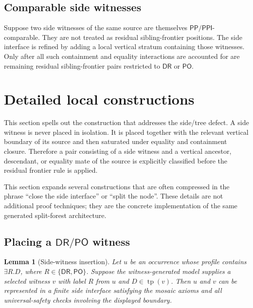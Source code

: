 \documentclass[11pt]{article}
\newtheorem{lemma}[theorem]{Lemma}
\newcommand{\DR}{\mathsf{DR}}
\newcommand{\PO}{\mathsf{PO}}
\newcommand{\PP}{\mathsf{PP}}
\newcommand{\PPI}{\mathsf{PPI}}
\newcommand{\typ}{\operatorname{tp}}
\begin{document}
\subsection{Comparable side witnesses}

Suppose two side witnesses of the same source are themselves $\PP/\PPI$-comparable.  They are not treated as residual sibling-frontier positions.  The side interface is refined by adding a local vertical stratum containing those witnesses.  Only after all such containment and equality interactions are accounted for are remaining residual sibling-frontier pairs restricted to $\DR$ or $\PO$.



\section{Detailed local constructions}

This section spells out the construction that addresses the side/tree defect.  A side witness is never placed in isolation.  It is placed together with the relevant vertical boundary of its source and then saturated under equality and containment closure.  Therefore a pair consisting of a side witness and a vertical ancestor, descendant, or equality mate of the source is explicitly classified before the residual frontier rule is applied.

\label{sec:detailed-local}

This section expands several constructions that are often compressed in the phrase ``close the side interface'' or ``split the node''.  These details are not additional proof techniques; they are the concrete implementation of the same generated split-forest architecture.

\subsection{Placing a \texorpdfstring{$\DR/\PO$}{DR/PO} witness}

\begin{lemma}[Side-witness insertion]\label{lem:side-witness-insertion}
Let $u$ be an occurrence whose profile contains $\exists R.D$, where $R\in\{\DR,\PO\}$.  Suppose the witness-generated model supplies a selected witness $v$ with label $R$ from $u$ and $D\in\typ(v)$.  Then $u$ and $v$ can be represented in a finite side interface satisfying the mosaic axioms and all universal-safety checks involving the displayed boundary.
\end{lemma}
\end{document}
